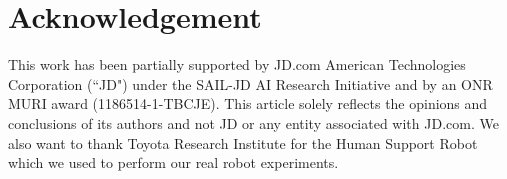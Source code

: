 \documentclass[letterpaper, 10 pt, conference]{ieeeconf}
\begin{document}
\section*{Acknowledgement}
This work has been partially supported by JD.com American Technologies Corporation (``JD") under the SAIL-JD AI Research Initiative and by an ONR MURI award (1186514-1-TBCJE). This article solely reflects the opinions and conclusions of its authors and not JD or any entity associated with JD.com. We also want to thank Toyota Research Institute for the Human Support Robot which we used to perform our real robot experiments.

\begin{flushright}
\printbibliography
\end{flushright}
\end{document}
